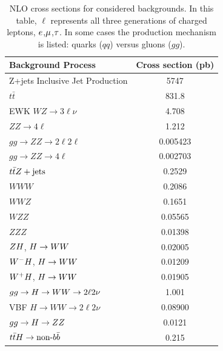 \begin{table}[htpb]
\begin{center}
\begin{footnotesize}
\begin{tabular}{lc}
Background Process& Cross section (pb) \\
\hline
Z+jets Inclusive Jet Production & 5747 \\
$t\bar{t}$ & 831.8\\
EWK $WZ \rightarrow 3\ell\nu$& 4.708\\
$ZZ \rightarrow 4\ell$& 1.212\\
$gg \rightarrow ZZ \rightarrow 2\ell2\ell$ & 0.005423 \\
$gg \rightarrow ZZ \rightarrow 4\ell$ & 0.002703 \\
$t\bar{t}Z + \text{jets}$ & 0.2529 \\
$WWW$   & 0.2086  \\
$WWZ$   & 0.1651  \\
$WZZ$   & 0.05565  \\
$ZZZ$   & 0.01398  \\
$ZH$, $H \rightarrow WW$  & 0.02005  \\
$W^{-}H$, $H \rightarrow WW$  & 0.01209  \\
$W^{+}H$, $H \rightarrow WW$  & 0.01905  \\
$gg \rightarrow H \rightarrow WW \rightarrow 2\ell 2\nu$& 1.001\\
VBF $H \rightarrow WW \rightarrow 2\ell 2\nu$ & 0.08900\\
$gg \rightarrow H \rightarrow ZZ$  & 0.0121  \\
$t\bar{t}H \rightarrow \text{non-}b\bar{b}$  & 0.215  \\
\hline
\end{tabular} 
\end{footnotesize}
\end{center}
\caption{
    NLO cross sections for considered backgrounds. In this table, $\ell$ represents all three generations of charged leptons, $e$,$\mu$,$\tau$. In some cases the production mechanism is listed: quarks ($qq$) versus gluons ($gg$).
}
\label{tab:vh_bkg_xsec}
\end{table}


